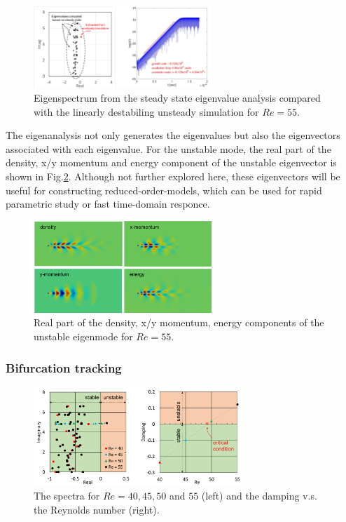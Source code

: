 \documentclass[journal,final]{new-aiaa}
\begin{document}
\begin{figure}[htb]
	\centering   
	\includegraphics[width=0.6\textwidth]{pic/uns-vs-eigen.png}	
	\caption{Eigenspectrum from the steady state eigenvalue analysis
		compared with the linearly destabiling unsteady simulation for $Re=55$.}
	\label{fig:cyl-re55-eigen-vs-uns}
\end{figure}

The eigenanalysis not only generates the eigenvalues but also the eigenvectors
associated with each eigenvalue. For the unstable mode, the real part of the
density, x/y momentum and energy component of the unstable eigenvector
is shown in Fig.\ref{fig:cyl-re55-eigenmode}. Although not further explored
here, these eigenvectors will be useful for constructing reduced-order-models,
which can be used for rapid parametric study or fast time-domain responce.
\begin{figure}[htb]
	\centering   
	\includegraphics[width=0.6\textwidth]{pic/eigenmode-real.png}	
	\caption{Real part of the density, x/y momentum, energy components
		of the unstable eigenmode for $Re=55$.}
	\label{fig:cyl-re55-eigenmode}
\end{figure}

\subsubsection{Bifurcation tracking}
\begin{figure}[htb]
	\centering   
	\includegraphics[width=0.7\textwidth]{pic/cylinder-bifurcation.png}	
	\caption{The spectra for $Re=40, 45, 50$ and $55$ (left) and the damping v.s. the Reynolds number (right).}
	\label{fig:cyl-bifur}
\end{figure}
\end{document}
